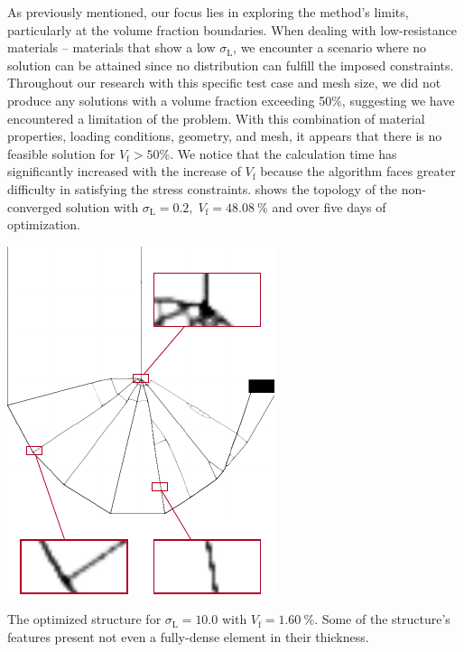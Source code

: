 As previously mentioned, our focus lies in exploring the method's limits, particularly at the volume fraction boundaries. When dealing with low-resistance materials -- \ie materials that show a low $\sigma_\text{L}$, we encounter a scenario where no solution can be attained since no distribution can fulfill the imposed constraints. Throughout our research with this specific test case and mesh size, we did not produce any solutions with a volume fraction exceeding 50\%, suggesting we have encountered a limitation of the problem. With this combination of material properties, loading conditions, geometry, and mesh, it appears that there is no feasible solution for $V_\text{f} > 50\%$. We notice that the calculation time has significantly increased with the increase of $V_\text{f}$ because the algorithm faces greater difficulty in satisfying the stress constraints.  shows the topology of the non-converged solution with $\sigma_\text{L}=0.2, \; V_\text{f}=\qty{48.08}{\percent}$ and over five days of optimization.
\begin{marginfigure}
    \centering
    \includegraphics[width=0.8\linewidth]{figures/03_comparison_TO_TTO/09_to_zoom/to_zoom.pdf}
    \caption{The optimized structure for $\sigma_\text{L}=10.0$ with $V_\text{f}=\qty{1.60}{\percent}$. Some of the structure's features present not even a fully-dense element in their thickness.}
    \label{fig:03_to_sol_zoom}
\end{marginfigure}

